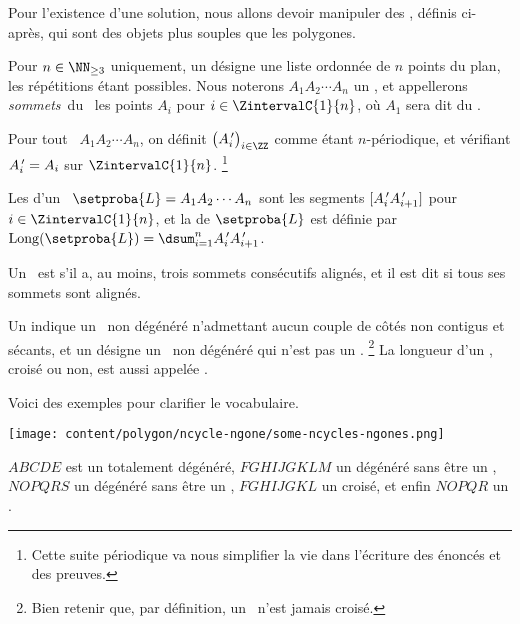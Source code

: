 Pour l'existence d'une solution, nous allons devoir manipuler des \ncycles, définis ci-après, qui sont des objets plus souples que les polygones.




\begin{defi}
	Pour $n \in \NN_{\geq3}$ uniquement, un \focus{\ncycle} désigne une liste ordonnée de $n$ points du plan, les répétitions étant possibles.
	Nous noterons $A_1 A_2 \cdots A_n$ un \ncycle, 
	et appellerons 
	\og \emph{sommets}\fg\ du \ncycle\ les points $A_i$ pour $i \in \ZintervalC{1}{n}$,
	où $A_1$ sera dit  du \ncycle.
\end{defi}


\begin{defi}
    Pour tout \ncycle\ $A_1 A_2 \cdots A_n$, on définit $\big( \primeit{A}_i \big)_{i \in \ZZ}$ comme étant $n$-périodique, et vérifiant $A^{\,\prime}_{i} = A_i$ sur $\ZintervalC{1}{n}$.%
	\footnote{
		Cette suite périodique va nous simplifier la vie dans l'écriture des énoncés et des preuves.
	}
\end{defi}


\begin{defi}
	Les  d'un \ncycle\ $\setproba{L} = A_1 A_2 \cdots A_n$ sont les segments
	$[A^{\,\prime}_i A^{\,\prime}_{i+1}]$ pour $i \in \ZintervalC{1}{n}$,
	et
	la  de $\setproba{L}$ est définie par $\cyclelen{\setproba{L}} = \dsum_{i=1}^{n} \primeit{A}_i \primeit{A}_{i+1}$.
\end{defi}


\begin{defi}
	Un \ncycle\ est  s'il a, au moins, trois sommets consécutifs alignés,
	et il est dit  si tous ses sommets sont alignés.
\end{defi}




\begin{defi} 
    Un \focus{\ngone} indique un \ncycle\ non dégénéré n'admettant aucun couple de côtés non contigus et sécants,
    et
    un  désigne un \ncycle\ non dégénéré qui n'est pas un \ngone.%
	\footnote{
		Bien retenir que, par définition, un \ngone\ n'est jamais croisé.
	}
	La longueur d'un \ngone, croisé ou non, est aussi appelée .
\end{defi}


\begin{remark} 
    Voici des exemples pour clarifier le vocabulaire.
    \begin{center}
    	\texttt{[image: content/polygon/ncycle-ngone/some-ncycles-ngones.png]}
    \end{center}
    
    $ABCDE$ est un  totalement dégénéré,
    $FGHIJGKLM$ un  dégénéré sans être un ,
    $NOPQRS$ un  dégénéré sans être un ,
    $FGHIJGKL$ un  croisé, 
    et enfin
    $NOPQR$ un .
\end{remark}


